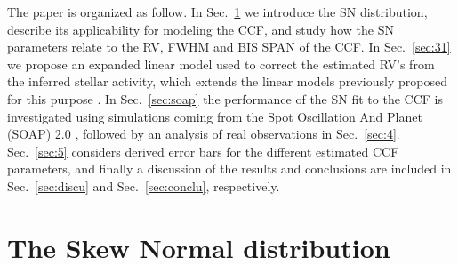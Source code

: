 \documentclass[11pt, oneside]{article}
\begin{document}
The paper is organized as follow. In Sec.~\ref{sec:2} we introduce the SN distribution, describe its applicability for modeling the CCF, and study how the SN parameters relate to the RV, FWHM and BIS SPAN of the CCF. 
%
In Sec.~\ref{sec:31} we propose an expanded linear model used to correct the estimated RV's from the inferred stellar activity, which extends the linear models previously proposed for this purpose \citep{Dumusque:2017aa,Feng:2017aa}. 
%
In Sec.~\ref{sec:soap} the performance of the SN fit to the CCF is investigated using simulations coming from the Spot Oscillation And Planet (SOAP) 2.0 \citep{Dumusque-2014b}, followed by an analysis of real observations in Sec.~\ref{sec:4}.
%
Sec.~\ref{sec:5} considers derived error bars for the different estimated CCF parameters, and finally a discussion of the results and conclusions are included in Sec.~\ref{sec:discu} and Sec.~\ref{sec:conclu}, respectively.

\section{The Skew Normal distribution} \label{sec:2}
\end{document}
